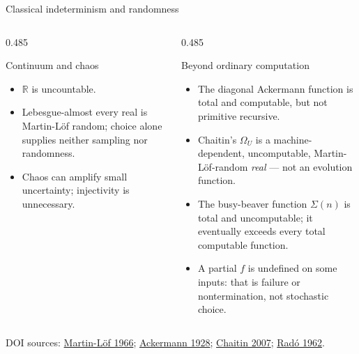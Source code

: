 \documentclass{beamer}
\newcommand{\doiref}[2]{%
  \href{https://doi.org/#1}{\textcolor{blue!65!black}{#2}}}
\newcommand{\sourcefoot}[1]{%
  \par\vfill{\tiny\color{black!60}DOI sources: #1\par}}
\begin{document}
\begin{frame}{Classical indeterminism and randomness}
\footnotesize
\begin{columns}[T,onlytextwidth]
\begin{column}{0.485\textwidth}
\begin{block}{Continuum and chaos}
\begin{itemize}
  \setlength{\itemsep}{0.32em}
  \item $\mathbb{R}$ is uncountable.
  \item Lebesgue-almost every real is Martin-L\"of random; choice alone
        supplies neither sampling nor randomness.
  \item Chaos can amplify small uncertainty; injectivity is unnecessary.
\end{itemize}
\end{block}
\end{column}

\begin{column}{0.485\textwidth}
\begin{exampleblock}{Beyond ordinary computation}
\begin{itemize}
  \setlength{\itemsep}{0.45em}
  \item The diagonal Ackermann function is total and computable, but not
        primitive recursive.
  \item Chaitin's $\Omega_U$ is a machine-dependent, uncomputable,
        Martin-L\"of-random \emph{real} --- not an evolution function.
  \item The busy-beaver function $\Sigma(n)$ is total and uncomputable; it
        eventually exceeds every total computable function.
  \item A partial $f$ is undefined on some inputs: that is failure or
        nontermination, not stochastic choice.
\end{itemize}
\end{exampleblock}
\end{column}
\end{columns}

\sourcefoot{\doiref{10.1016/S0019-9958(66)80018-9}{Martin-L\"of 1966};
\doiref{10.1007/BF01459088}{Ackermann 1928};
\doiref{10.1007/s00032-006-0064-2}{Chaitin 2007};
\doiref{10.1002/j.1538-7305.1962.tb00480.x}{Rad\'o 1962}.}
\end{frame}
\end{document}

